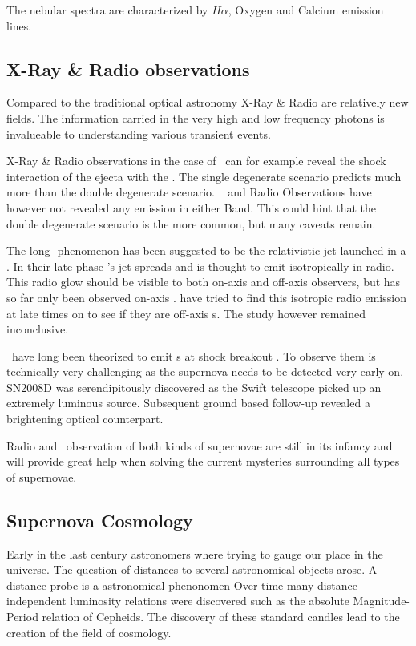 The nebular spectra are characterized by $H\alpha$, Oxygen and Calcium emission lines. 


\subsection{X-Ray \& Radio observations}

Compared to the traditional optical astronomy X-Ray \& Radio are relatively new fields. The information carried in the very high and low frequency photons is invalueable to understanding various transient events. 

X-Ray \& Radio observations in the case of \sneia\ can for example reveal the shock interaction of the ejecta with the \csm. The single degenerate scenario predicts much more \csm than the double degenerate scenario. \xray\ \citep{2007ApJ...670.1260H} and Radio Observations \citep{2011arXiv1105.6188H} have however not revealed any emission in either Band. This could hint that the double degenerate scenario is the more common, but many caveats remain. 


The long \grb-phenomenon has been suggested to be the relativistic jet launched in a \snibc. In their late phase \grb 's jet spreads and is thought to emit isotropically in radio. This radio glow should be visible to both on-axis and off-axis observers, but has so far only been observed on-axis . \cite{2006ApJ...638..930S} have tried to find this isotropic radio emission at late times on \snibc to see if they are off-axis \grb s. The study however remained inconclusive.


\sneii\ have long been theorized to emit \xray s at shock breakout \citep{1978ApJ...223L.109K,1974ApJ...187..333C }. To observe them is technically very challenging as the supernova needs to be detected very early on. SN2008D was serendipitously discovered as the Swift \xray telescope picked up an extremely luminous source. Subsequent ground based follow-up revealed a brightening optical counterpart. 

Radio and \xray\ observation of both kinds of supernovae are still in its infancy and will provide great help when solving the current mysteries surrounding all types of supernovae.

\subsection{Supernova Cosmology}

Early in the last century astronomers where trying to gauge our place in the universe. The question of distances to several astronomical objects arose. A distance probe is a astronomical phenonomen Over time many distance-independent luminosity relations were discovered such as the absolute Magnitude-Period relation of Cepheids. The discovery of these standard candles lead to the creation of the field of cosmology. 

